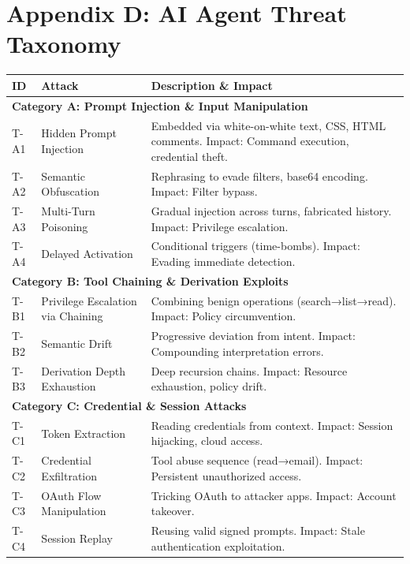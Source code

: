 \section*{Appendix D: AI Agent Threat Taxonomy}

\noindent
{\scriptsize
\setlength{\tabcolsep}{3pt}
\begin{tabular}{|l|p{3cm}|p{12.8cm}|}
\hline
\textbf{ID} & \textbf{Attack} & \textbf{Description \& Impact} \\
\hline
\multicolumn{3}{|l|}{\textbf{Category A: Prompt Injection \& Input Manipulation}} \\
\hline
T-A1 & Hidden Prompt Injection & Embedded via white-on-white text, CSS, HTML comments. Impact: Command execution, credential theft. \\
T-A2 & Semantic Obfuscation & Rephrasing to evade filters, base64 encoding. Impact: Filter bypass. \\
T-A3 & Multi-Turn Poisoning & Gradual injection across turns, fabricated history. Impact: Privilege escalation. \\
T-A4 & Delayed Activation & Conditional triggers (time-bombs). Impact: Evading immediate detection. \\
\hline
\multicolumn{3}{|l|}{\textbf{Category B: Tool Chaining \& Derivation Exploits}} \\
\hline
T-B1 & Privilege Escalation via Chaining & Combining benign operations (search→list→read). Impact: Policy circumvention. \\
T-B2 & Semantic Drift & Progressive deviation from intent. Impact: Compounding interpretation errors. \\
T-B3 & Derivation Depth Exhaustion & Deep recursion chains. Impact: Resource exhaustion, policy drift. \\
\hline
\multicolumn{3}{|l|}{\textbf{Category C: Credential \& Session Attacks}} \\
\hline
T-C1 & Token Extraction & Reading credentials from context. Impact: Session hijacking, cloud access. \\
T-C2 & Credential Exfiltration & Tool abuse sequence (read→email). Impact: Persistent unauthorized access. \\
T-C3 & OAuth Flow Manipulation & Tricking OAuth to attacker apps. Impact: Account takeover. \\
T-C4 & Session Replay & Reusing valid signed prompts. Impact: Stale authentication exploitation. \\
\hline

\end{tabular}}
